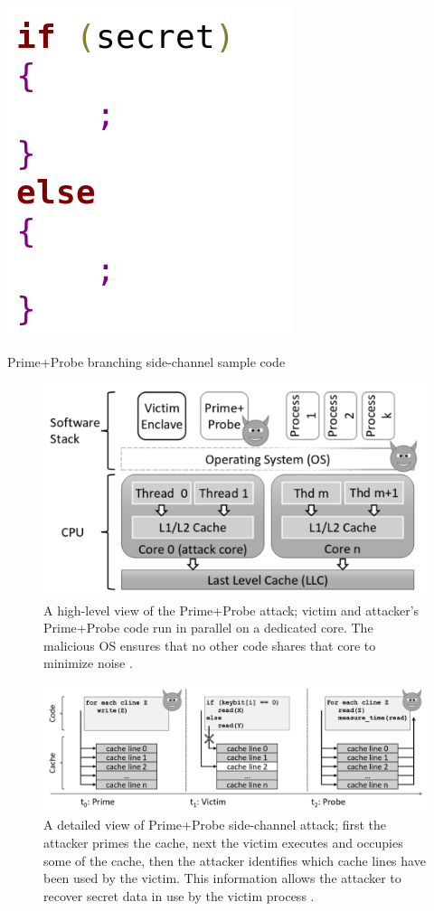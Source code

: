 \begin{algorithm}[t]
	\includegraphics[scale=0.22]{images/alg}
	\caption{Prime+Probe branching side-channel sample code \cite{stealthy,cloak}}
	\label{alg:one}
\end{algorithm}

\begin{figure}
	\includegraphics[scale=0.2]{images/pp1}
	\caption{A high-level view of the Prime+Probe attack; victim and attacker’s Prime+Probe code run in parallel on a dedicated core. The malicious OS  ensures  that  no  other  code shares that core to minimize noise \cite{brasser2017software}.}
	\label{fig:ppone}
\end{figure}

\begin{figure}
	\includegraphics[scale=0.2]{images/pp2}
	\caption{A detailed view of Prime+Probe side-channel attack; first the attacker primes the cache, next the victim executes and occupies some of the cache, then the attacker identifies which cache lines have been used by the victim. This information allows the attacker to recover secret data in use by the victim process \cite{brasser2017software}.}
	\label{fig:pptwo}
\end{figure}

